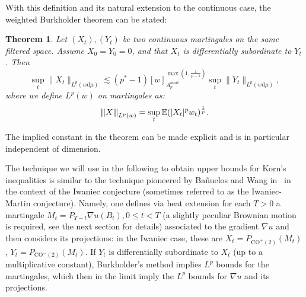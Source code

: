 \documentclass[11pt, a4paper]{amsart}
\newtheorem{theorem}{Theorem}[section]
\theoremstyle{definition}
\theoremstyle{remark}
\newcommand{\vvvert}[1]{
    {\left\vert\kern-0.25ex\left\vert\kern-
    0.25ex\left\vert #1 
    \right\vert\kern-0.25ex\right\vert\kern-
    0.25ex\right\vert}
}
\begin{document}
With this definition and its natural extension
to the continuous case, the weighted
Burkholder theorem can be stated:
\begin{theorem}\label{thm:burkweight}
Let $(X_t), (Y_t)$ be two continuous martingales
on the same filtered space. 
Assume $X_0=Y_0=0$, and that
$X_t$ is differentially subordinate to $Y_t$. Then
\begin{equation*}
\sup_t \|X_t\|_{L^p(w\mathrm{d}\mu)}\lesssim
(p^*-1)[w]^{\max(1,\frac1{p-1})}_{A_p^{\mathrm{mart}}}
\sup_t \|Y_t\|_{L^p(w\mathrm d \mu)},
\end{equation*}
where we define $L^p(w)$ on martingales as:
\begin{equation*}
\vvvert{X}_{L^p(w)}=
\sup_t \mathbb E(|X_t|^pw_t)^{\frac1p}.
\end{equation*}
\end{theorem}
The implied constant in the theorem can be
made explicit and is
in particular independent of dimension.

The technique we will use in 
the following to obtain upper bounds
for Korn's inequalities is 
similar to the technique pioneered by Bañuelos and Wang
in~\cite{Banuelos1995SHARP2po}
in the context of the Iwaniec conjecture (sometimes referred to as
the Iwaniec-Martin conjecture).
Namely, one defines via heat extension
for each $T>0$ a martingale 
$M_t=P_{T-t}\nabla u(B_t),0\le t<T$ (a slightly
peculiar Brownian motion is 
required, see the next section for details)
associated to the gradient $\nabla u$ and then considers
its projections: in the Iwaniec case, these are 
$X_t=P_{\mathrm{CO}^+(2)}(M_t)$,
$Y_t=P_{\mathrm{CO}^-(2)}(M_t)$.
If $Y_t$ is differentially subordinate to $X_t$
(up to a multiplicative constant), Burkholder's method
implies $L^p$ bounds for the martingales,
which then in the limit imply the $L^p$ bounds
for $\nabla u$ and its projections.
\end{document}
